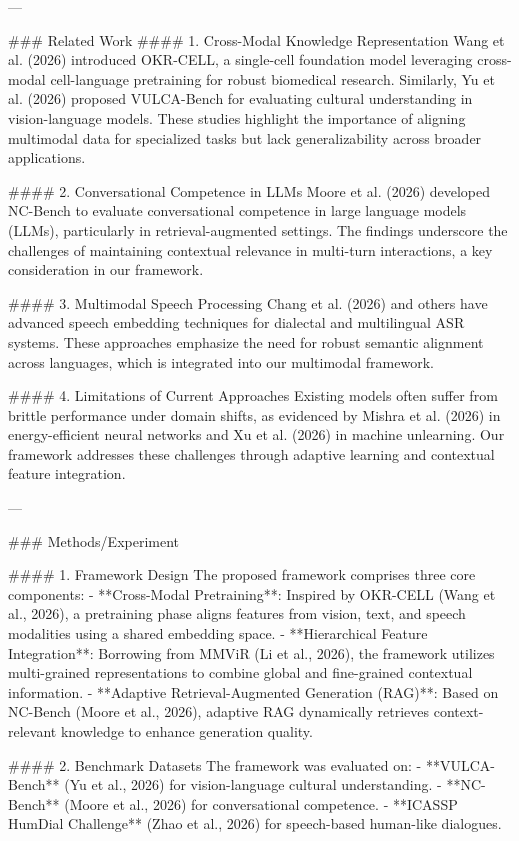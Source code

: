 ---

### Related Work
#### 1. Cross-Modal Knowledge Representation
Wang et al. (2026) introduced OKR-CELL, a single-cell foundation model leveraging cross-modal cell-language pretraining for robust biomedical research. Similarly, Yu et al. (2026) proposed VULCA-Bench for evaluating cultural understanding in vision-language models. These studies highlight the importance of aligning multimodal data for specialized tasks but lack generalizability across broader applications.

#### 2. Conversational Competence in LLMs
Moore et al. (2026) developed NC-Bench to evaluate conversational competence in large language models (LLMs), particularly in retrieval-augmented settings. The findings underscore the challenges of maintaining contextual relevance in multi-turn interactions, a key consideration in our framework.

#### 3. Multimodal Speech Processing
Chang et al. (2026) and others have advanced speech embedding techniques for dialectal and multilingual ASR systems. These approaches emphasize the need for robust semantic alignment across languages, which is integrated into our multimodal framework.

#### 4. Limitations of Current Approaches
Existing models often suffer from brittle performance under domain shifts, as evidenced by Mishra et al. (2026) in energy-efficient neural networks and Xu et al. (2026) in machine unlearning. Our framework addresses these challenges through adaptive learning and contextual feature integration.

---

### Methods/Experiment

#### 1. Framework Design
The proposed framework comprises three core components:
- **Cross-Modal Pretraining**: Inspired by OKR-CELL (Wang et al., 2026), a pretraining phase aligns features from vision, text, and speech modalities using a shared embedding space.
- **Hierarchical Feature Integration**: Borrowing from MMViR (Li et al., 2026), the framework utilizes multi-grained representations to combine global and fine-grained contextual information.
- **Adaptive Retrieval-Augmented Generation (RAG)**: Based on NC-Bench (Moore et al., 2026), adaptive RAG dynamically retrieves context-relevant knowledge to enhance generation quality.

#### 2. Benchmark Datasets
The framework was evaluated on:
- **VULCA-Bench** (Yu et al., 2026) for vision-language cultural understanding.
- **NC-Bench** (Moore et al., 2026) for conversational competence.
- **ICASSP HumDial Challenge** (Zhao et al., 2026) for speech-based human-like dialogues.

